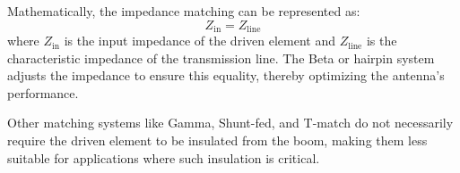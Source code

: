 Mathematically, the impedance matching can be represented as:
\[
Z_{\text{in}} = Z_{\text{line}}
\]
where \( Z_{\text{in}} \) is the input impedance of the driven element and \( Z_{\text{line}} \) is the characteristic impedance of the transmission line. The Beta or hairpin system adjusts the impedance to ensure this equality, thereby optimizing the antenna's performance.

Other matching systems like Gamma, Shunt-fed, and T-match do not necessarily require the driven element to be insulated from the boom, making them less suitable for applications where such insulation is critical.

